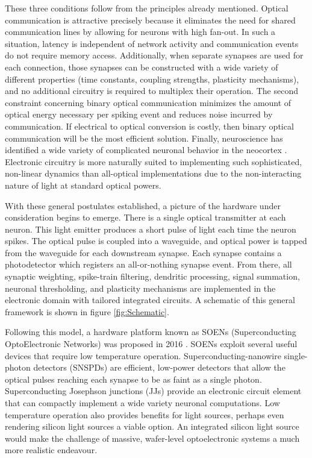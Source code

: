 \documentclass[twocolumn]{article}
\begin{document}
These three conditions follow from the principles already mentioned. Optical communication is attractive precisely because it eliminates the need for shared communication lines by allowing for neurons with high fan-out. In such a situation, latency is independent of network activity and communication events do not require memory access. Additionally, when separate synapses are used for each connection, those synapses can be constructed with a wide variety of different properties (time constants, coupling strengths, plasticity mechanisms), and no additional circuitry is required to multiplex their operation. The second constraint concerning binary optical communication minimizes the amount of optical energy necessary per spiking event and reduces noise incurred by communication. If electrical to optical conversion is costly, then binary optical communication will be the most efficient solution. Finally, neuroscience has identified a wide variety of complicated neuronal behavior in the neocortex \cite{izhikevich2004model}. Electronic circuitry is more naturally suited to implementing such sophisticated, non-linear dynamics than all-optical implementations due to the non-interacting nature of light at standard optical powers.

With these general postulates established, a picture of the hardware under consideration begins to emerge. There is a single optical transmitter at each neuron. This light emitter produces a short pulse of light each time the neuron spikes. The optical pulse is coupled into a waveguide, and optical power is tapped from the waveguide for each downstream synapse. Each synapse contains a photodetector which registers an all-or-nothing synapse event. From there, all synaptic weighting, spike-train filtering, dendritic processing, signal summation, neuronal thresholding, and plasticity mechanisms are implemented in the electronic domain with tailored integrated circuits. A schematic of this general framework is shown in figure \ref{fig:Schematic}.

Following this model, a hardware platform known as SOENs (Superconducting OptoElectronic Networks) was proposed in 2016 \cite{shainline2017superconducting}. SOENs exploit several useful devices that require low temperature operation. Superconducting-nanowire single-photon detectors (SNSPDs) are efficient, low-power detectors that allow the optical pulses reaching each synapse to be as faint as a single photon. Superconducting Josephson junctions (JJs) provide an electronic circuit element that can compactly implement a wide variety neuronal computations. Low temperature operation also provides benefits for light sources, perhaps even rendering silicon light sources a viable option. An integrated silicon light source would make the challenge of massive, wafer-level optoelectronic systems a much more realistic endeavour. 
\end{document}
